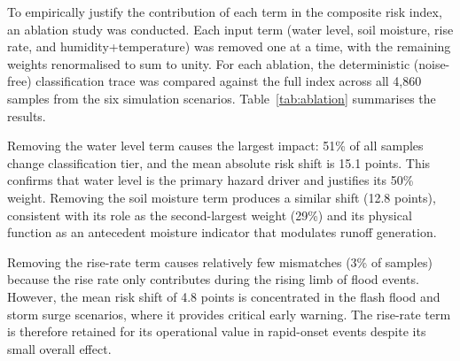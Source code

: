 \documentclass[5p,twocolumn]{elsarticle}
\begin{document}
To empirically justify the contribution of each term in the composite risk index, an ablation study was conducted. Each input term (water level, soil moisture, rise rate, and humidity+temperature) was removed one at a time, with the remaining weights renormalised to sum to unity. For each ablation, the deterministic (noise-free) classification trace was compared against the full index across all 4,860 samples from the six simulation scenarios. Table~\ref{tab:ablation} summarises the results.

\begin{table}[htbp]
  \caption{Ablation study: effect of removing each term on classification agreement and risk magnitude. ``Tier mismatches'' counts samples where the tier differs from the full index. Mean $|\Delta R|$ is the average absolute risk difference.}
  \label{tab:ablation}
  \centering
  \footnotesize
  \setlength{\tabcolsep}{3pt}
\end{table}

Removing the water level term causes the largest impact: 51\% of all samples change classification tier, and the mean absolute risk shift is 15.1 points. This confirms that water level is the primary hazard driver and justifies its 50\% weight. Removing the soil moisture term produces a similar shift (12.8 points), consistent with its role as the second-largest weight (29\%) and its physical function as an antecedent moisture indicator that modulates runoff generation.

Removing the rise-rate term causes relatively few mismatches (3\% of samples) because the rise rate only contributes during the rising limb of flood events. However, the mean risk shift of 4.8 points is concentrated in the flash flood and storm surge scenarios, where it provides critical early warning. The rise-rate term is therefore retained for its operational value in rapid-onset events despite its small overall effect.
\end{document}

